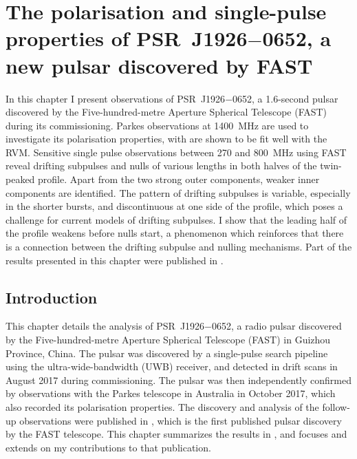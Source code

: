 \chapter[The polarisation and single-pulse properties of PSR~J1926$-$0652 \texorpdfstring{PSR~J1926$-$0652}{PSR~J12926--0652}]{The polarisation and single-pulse properties of PSR~J1926$-$0652, a new pulsar discovered by FAST}
\label{chapt: J1926}

In this chapter I present observations of PSR~J1926$-$0652, a 1.6-second pulsar discovered by the Five-hundred-metre Aperture Spherical Telescope (FAST) during its commissioning. Parkes observations at 1400~MHz are used to investigate its polarisation properties, with are shown to be fit well with the RVM. Sensitive single pulse observations between 270 and 800~MHz using FAST reveal drifting subpulses and nulls of various lengths in both halves of the twin-peaked profile. Apart from the two strong outer components, weaker inner components are identified.  The pattern of drifting subpulses is variable, especially in the shorter bursts, and discontinuous at one side of the profile, which poses a challenge for current models of drifting subpulses. I show that the leading half of the profile weakens before nulls start, a phenomenon which reinforces that there is a connection between the drifting subpulse and nulling mechanisms. Part of the results presented in this chapter were published in \citet{ZLH+2019}.

\section{Introduction}
\label{sec: J1926 - intro}

This chapter details the analysis of PSR~J1926$-$0652, a radio pulsar discovered by the Five-hundred-metre Aperture Spherical Telescope (FAST) in Guizhou Province, China. The pulsar was discovered by a single-pulse search pipeline \citep{ZBM+2014} using the ultra-wide-bandwidth (UWB) receiver, and detected in drift scans in August 2017 during commissioning. The pulsar was then independently confirmed by observations with the Parkes telescope in Australia in October 2017, which also recorded its polarisation properties. The discovery and analysis of the follow-up observations were published in \citet{ZLH+2019}, which is the first published pulsar discovery by the FAST telescope. This chapter summarizes the results in \citet{ZLH+2019}, and focuses and extends on my contributions to that publication.


